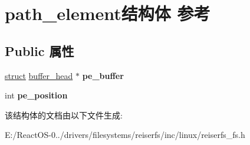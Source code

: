 \hypertarget{structpath__element}{}\section{path\+\_\+element结构体 参考}
\label{structpath__element}
\subsection*{Public 属性}
\begin{DoxyCompactItemize}
\item 
\mbox{\label{structpath__element_a0b7560f6da092d48d3cde117d0ab22b2}} 
\hyperlink{interfacestruct}{struct} \hyperlink{structbuffer__head}{buffer\+\_\+head} $\ast$ {\bfseries pe\+\_\+buffer}
\item 
\mbox{\label{structpath__element_a741f303b0dbbdf6b0f3ee3e7c9c131d6}} 
int {\bfseries pe\+\_\+position}
\end{DoxyCompactItemize}


该结构体的文档由以下文件生成\+:\begin{DoxyCompactItemize}
\item 
E\+:/\+React\+O\+S-\/0../drivers/filesystems/reiserfs/inc/linux/reiserfs\+\_\+fs.\+h\end{DoxyCompactItemize}
